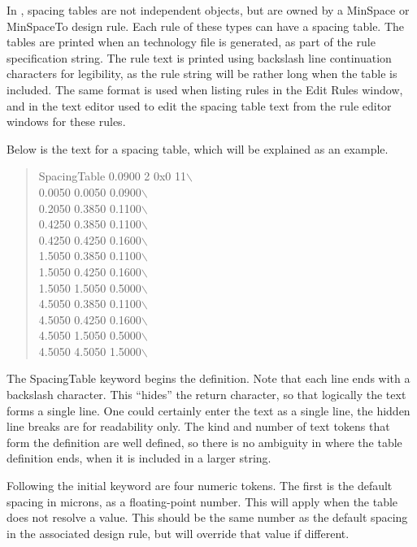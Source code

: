 In {\Xic}, spacing tables are not independent objects, but are owned
by a {\et MinSpace} or {\et MinSpaceTo} design rule.  Each rule of
these types can have a spacing table.  The tables are printed when an
{\Xic} technology file is generated, as part of the rule specification
string.  The rule text is printed using backslash line continuation
characters for legibility, as the rule string will be rather long when
the table is included.  The same format is used when listing rules in
the {\cb Edit Rules} window, and in the text editor used to edit the
spacing table text from the rule editor windows for these rules.

Below is the text for a spacing table, which will be explained as an
example.

\begin{quote}\vt
SpacingTable 0.0900 2 0x0 11$\backslash$\\
   0.0050 0.0050 0.0900$\backslash$\\
   0.2050 0.3850 0.1100$\backslash$\\
   0.4250 0.3850 0.1100$\backslash$\\
   0.4250 0.4250 0.1600$\backslash$\\
   1.5050 0.3850 0.1100$\backslash$\\
   1.5050 0.4250 0.1600$\backslash$\\
   1.5050 1.5050 0.5000$\backslash$\\
   4.5050 0.3850 0.1100$\backslash$\\
   4.5050 0.4250 0.1600$\backslash$\\
   4.5050 1.5050 0.5000$\backslash$\\
   4.5050 4.5050 1.5000$\backslash$
\end{quote}

The {\vt SpacingTable} keyword begins the definition.  Note that each
line ends with a backslash character.  This ``hides'' the return
character, so that logically the text forms a single line.  One could
certainly enter the text as a single line, the hidden line breaks are
for readability only.  The kind and number of text tokens that form
the definition are well defined, so there is no ambiguity in where the
table definition ends, when it is included in a larger string.

Following the initial keyword are four numeric tokens.  The first is
the default spacing in microns, as a floating-point number.  This will
apply when the table does not resolve a value.  This should be the
same number as the default spacing in the associated design rule, but
will override that value if different.

